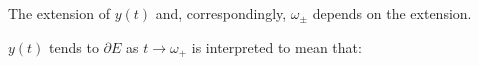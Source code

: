 \documentclass{article}
\newcommand{\bfs}[1]{\textbf{({#1}) }}
\begin{document}

\begin{rema}
The extension of $y(t)$  and, correspondingly, $\omega_{\pm}$ depends on the extension. 

$y(t)$ tends to $\partial E$ as $t \rightarrow \omega_{+}$ is interpreted to mean that:

\centerline{}
\end{rema}
\end{document}
